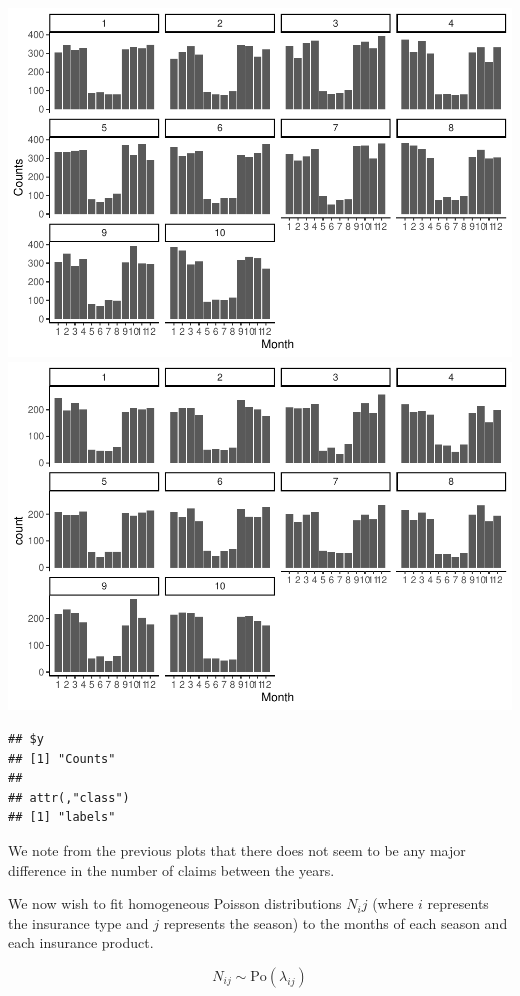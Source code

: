 \documentclass[]{article}
\begin{document}
\includegraphics{Projekt1_files/figure-latex/unnamed-chunk-3-1.pdf}
\includegraphics{Projekt1_files/figure-latex/unnamed-chunk-3-2.pdf}

\begin{verbatim}
## $y
## [1] "Counts"
## 
## attr(,"class")
## [1] "labels"
\end{verbatim}

We note from the previous plots that there does not seem to be any major
difference in the number of claims between the years.

We now wish to fit homogeneous Poisson distributions \(N_ij\) (where
\(i\) represents the insurance type and \(j\) represents the season) to
the months of each season and each insurance product.

\[
N_{ij} \sim \text{Po}(\lambda_{ij})
\]
\end{document}
